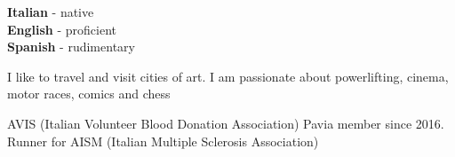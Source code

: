 \documentclass[9pt]{developercv} %
\begin{document}
\begin{entrylist}
\end{entrylist}


\begin{minipage}[t]{0.3\textwidth}
	\vspace{-\baselineskip} %

	
	\textbf{Italian} - native\\
	\textbf{English} - proficient\\
	\textbf{Spanish} - rudimentary
\end{minipage}
\hfill
\begin{minipage}[t]{0.3\textwidth}
	\vspace{-\baselineskip} %
	
	
	I like to travel and visit cities of art. I am passionate about powerlifting, cinema, motor races, comics and chess
\end{minipage}
\hfill
\begin{minipage}[t]{0.3\textwidth}
	\vspace{-\baselineskip} %
	
	
	AVIS (Italian Volunteer Blood Donation Association) Pavia member since 2016. Runner for AISM (Italian Multiple Sclerosis Association)
\end{minipage}

\end{document}
